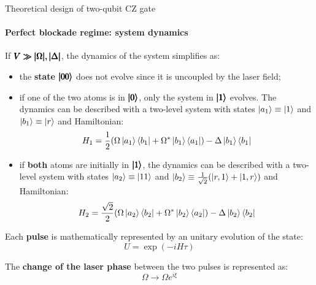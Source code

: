 \documentclass[8pt]{beamer}
\begin{document}
	\begin{frame}{Theoretical design of two-qubit CZ gate}
	\framesubtitle{Perfect blockade regime: system dynamics}	
	
	If $\pmb{V \gg \abs{\Omega}, \abs{\Delta} }$, the dynamics of the system simplifies as:
	
	\medskip
	
    \begin{itemize}
        \item the \textbf{state} $\pmb{\ket{00}}$ does not evolve since it is uncoupled by the laser field;
        
        \item if one of the two atoms is in $\pmb{\ket{0}}$, only the system in $\pmb{\ket{1}}$ evolves. The dynamics can be described with a \alert{two-level system} with states $\ket{a_1}\equiv\ket{1}$ and $\ket{b_1}\equiv\ket{r}$ and Hamiltonian:
        \begin{equation}
            H_1 = \frac{1}{2} \qty( \Omega \ket{a_1}\bra{b_1} + 
            \Omega^* \ket{b_1}\bra{a_1})
            - \Delta \ket{b_1}\bra{b_1}
            \label{eq:perfect-H_1}
        \end{equation}
        
        \item if \textbf{both} atoms are initially in $\pmb{\ket{1}}$, the dynamics can be described with a \alert{two-level system} with states $\ket{a_2}\equiv\ket{11}$ and $\ket{b_2}\equiv \frac{1}{\sqrt{2}} \qty( \ket{r,1} + \ket{1,r} )$ and Hamiltonian:
        \begin{equation}
            H_2 = \frac{\sqrt{2}}{2} \qty( \Omega \ket{a_2}\bra{b_2} + 
            \Omega^* \ket{b_2}\bra{a_2})
            - \Delta \ket{b_2}\bra{b_2}
            \label{eq:perfect-H_2}
        \end{equation}
        
    \end{itemize}

	 Each \textbf{pulse} is mathematically represented by an unitary evolution of the state:
    \begin{equation}
        U = \exp(-i H \tau)
        \label{eq:unitary_evolution}
    \end{equation}

    The \textbf{change of the laser phase} between the two pulses is represented as:
    \begin{equation}
        \Omega \rightarrow \Omega e^{i\xi}
    \end{equation}
    
	\end{frame}
	
\end{document}
